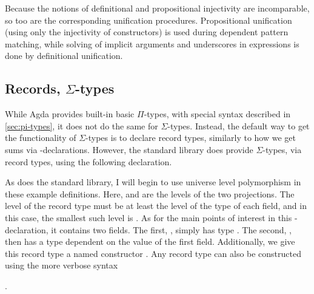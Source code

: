 Because the notions of definitional and propositional injectivity are
incomparable, so too are the corresponding unification procedures.
Propositional unification (using only the injectivity of constructors) is used
during dependent pattern matching, while solving of implicit arguments and
underscores in expressions is done by definitional unification.

\subsection{Records, $\Sigma$-types}

While Agda provides built-in basic $\Pi$-types, with special syntax described in
\cref{sec:pi-types}, it does not do the same for $\Sigma$-types.
Instead, the default way to get the functionality of $\Sigma$-types is to
declare record types, similarly to how we get sums via
-declarations.
However, the standard library does provide $\Sigma$-types, via record types,
using the following declaration.


As does the standard library, I will begin to use universe level polymorphism in
these example definitions.
Here,  and  are the levels of the two projections.
The level of the record type must be at least the level of the type of each
field, and in this case, the smallest such level is
\AgdaSpace{}\AgdaOperator{\AgdaPrimitive{$\sqcup$}}\AgdaSpace{}%
.
As for the main points of interest in this -declaration, it
contains two fields.
The first, , simply has type .
The second, , then has a type dependent on the value of the
first field.
Additionally, we give this record type a named constructor
\AgdaInductiveConstructor{\_,\_}.
Any record type can also be constructed using the more verbose syntax
\begin{code}[inline]%
\>[0]\AgdaSpace{}%
\AgdaSymbol{\{}\AgdaSpace{}%
\AgdaSpace{}%
\AgdaSymbol{=}\AgdaSpace{}%
\AgdaSpace{}%
\AgdaSymbol{;}\AgdaSpace{}%
\AgdaSpace{}%
\AgdaSymbol{=}\AgdaSpace{}%
\AgdaSpace{}%
\AgdaSymbol{\}}\<%
\end{code}.

